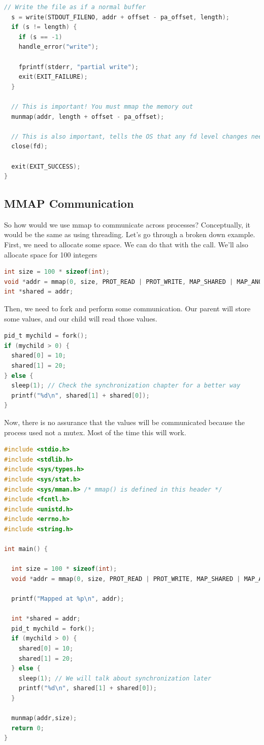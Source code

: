 \begin{lstlisting}[language=C]
  // Write the file as if a normal buffer
  s = write(STDOUT_FILENO, addr + offset - pa_offset, length);
  if (s != length) {
    if (s == -1)
    handle_error("write");

    fprintf(stderr, "partial write");
    exit(EXIT_FAILURE);
  }

  // This is important! You must mmap the memory out
  munmap(addr, length + offset - pa_offset);

  // This is also important, tells the OS that any fd level changes need to be addressed
  close(fd);

  exit(EXIT_SUCCESS);
}
\end{lstlisting}

\subsection{MMAP Communication}

So how would we use mmap to communicate across processes?
Conceptually, it would be the same as using threading.
Let's go through a broken down example.
First, we need to allocate some space.
We can do that with the  call.
We'll also allocate space for 100 integers

\begin{lstlisting}[language=C]
int size = 100 * sizeof(int);
void *addr = mmap(0, size, PROT_READ | PROT_WRITE, MAP_SHARED | MAP_ANONYMOUS, -1, 0);
int *shared = addr;
\end{lstlisting}

Then, we need to fork and perform some communication.
Our parent will store some values, and our child will read those values.

\begin{lstlisting}[language=C]
pid_t mychild = fork();
if (mychild > 0) {
  shared[0] = 10;
  shared[1] = 20;
} else {
  sleep(1); // Check the synchronization chapter for a better way
  printf("%d\n", shared[1] + shared[0]);
}
\end{lstlisting}

Now, there is no assurance that the values will be communicated because the process used  not a mutex.
Most of the time this will work.

\begin{lstlisting}[language=C]
#include <stdio.h>
#include <stdlib.h>
#include <sys/types.h>
#include <sys/stat.h>
#include <sys/mman.h> /* mmap() is defined in this header */
#include <fcntl.h>
#include <unistd.h>
#include <errno.h>
#include <string.h>

int main() {

  int size = 100 * sizeof(int);
  void *addr = mmap(0, size, PROT_READ | PROT_WRITE, MAP_SHARED | MAP_ANONYMOUS, -1, 0);

  printf("Mapped at %p\n", addr);

  int *shared = addr;
  pid_t mychild = fork();
  if (mychild > 0) {
    shared[0] = 10;
    shared[1] = 20;
  } else {
    sleep(1); // We will talk about synchronization later
    printf("%d\n", shared[1] + shared[0]);
  }

  munmap(addr,size);
  return 0;
}
\end{lstlisting}

